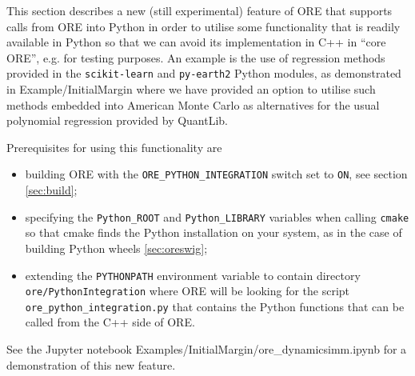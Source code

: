 This section describes a new (still experimental) feature of ORE that supports calls from ORE into Python in order to utilise
some functionality that is readily available in Python so that we can avoid its implementation in C++ in ``core ORE'', e.g.
for testing purposes. An example is the use of regression methods provided in the {\tt scikit-learn} and {\tt py-earth2}
Python modules, as demonstrated in Example/InitialMargin where we have provided an option to utilise such methods
embedded into American Monte Carlo as alternatives for the usual polynomial regression provided by QuantLib.

Prerequisites for using this functionality are
\begin{itemize}
\item building ORE with the {\tt ORE\_PYTHON\_INTEGRATION} switch set to {\tt ON}, see section \ref{sec:build};
\item specifying the {\tt Python\_ROOT} and {\tt Python\_LIBRARY} variables when calling {\tt cmake}
  so that cmake finds the Python installation on your system, as in the case of building Python wheels \ref{sec:oreswig};
\item extending the {\tt PYTHONPATH} environment variable to contain directory {\tt ore/PythonIntegration}
  where ORE will be looking for the script {\tt ore\_python\_integration.py} that contains the Python functions that
  can be called from the C++ side of ORE.
\end{itemize}

See the Jupyter notebook Examples/InitialMargin/ore\_dynamicsimm.ipynb for a demonstration of this new feature.
